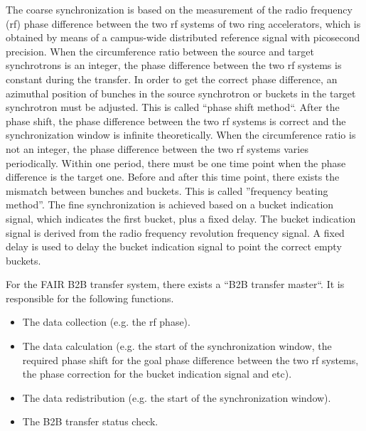 The coarse synchronization is based on the measurement of the radio frequency (rf) phase difference between the two rf systems of two ring accelerators, which is obtained by means of a campus-wide distributed reference signal with picosecond precision. When the circumference ratio between the source and target synchrotrons is an integer, the phase difference between the two rf systems is constant during the transfer. In order to get the correct phase difference, an azimuthal position of bunches in the source synchrotron or buckets in the target synchrotron must be adjusted. This is called “phase shift method“. After the phase shift, the phase difference between the two rf systems is correct and the synchronization window is infinite theoretically. When the circumference ratio is not an integer, the phase difference between the two rf systems varies periodically. Within one period, there must be one time point when the phase difference is the target one. Before and after this time point, there exists the mismatch between bunches and buckets. This is called ”frequency beating method”. The fine synchronization is achieved based on a bucket indication signal, which indicates the first bucket, plus a fixed delay. The bucket indication signal is derived from the radio frequency revolution frequency signal. A fixed delay is used to delay the bucket indication signal to point the correct empty buckets.

For the FAIR B2B transfer system, there exists a “B2B transfer master“. It is responsible for the following functions. 
\begin{itemize}

	\item 	The data collection (e.g. the rf phase). 
   \item 	The data calculation (e.g. the start of the synchronization window, the required phase shift for the goal phase difference between the two rf systems, the phase correction for the bucket indication signal and etc). 
   \item 	The data redistribution (e.g. the start of the synchronization window).
	\item The B2B transfer status check.
\end{itemize}


